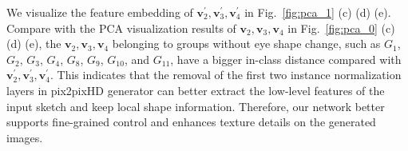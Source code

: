 
We visualize the feature embedding of $\boldsymbol{v}_2^{'},\boldsymbol{v}^{'}_3, \boldsymbol{v}_4^{'}$ in Fig.~\ref{fig:pca_1} (c) (d) (e). 
Compare with the PCA visualization results of $\boldsymbol{v}_2,\boldsymbol{v}_3,\boldsymbol{v}_4$ in 
Fig.~\ref{fig:pca_0} (c) (d) (e), the $\boldsymbol{v}_2, \boldsymbol{v}_3, \boldsymbol{v}_4$ belonging to groups without eye shape change, such as $G_1$, $G_2$, $G_3$, $G_4$, $G_8$, $G_9$, $G_{10}$, and $G_{11}$, have a bigger in-class distance compared with $\boldsymbol{v}_2^{'}, \boldsymbol{v}_3^{'}, \boldsymbol{v}_4^{'}$. 
This indicates that the removal of the first two instance normalization layers in pix2pixHD generator can better extract the low-level features of the input sketch and keep local shape information. 
Therefore, our network better supports fine-grained control and enhances texture details on the generated images.

